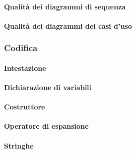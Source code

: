 		\paragraph{Qualità dei diagrammi di sequenza} %
		
		\paragraph{Qualità dei diagrammi dei casi d'uso} %
		
		

        \subsubsection{Codifica}\label{PP:Sviluppo:Codifica} %
        
        \paragraph{Intestazione} %
        
        \paragraph{Dichiarazione di variabili}  %
        
        \paragraph{Costruttore} %
        
        \paragraph{Operatore di espansione} %
        
        \paragraph{Stringhe} %
        
